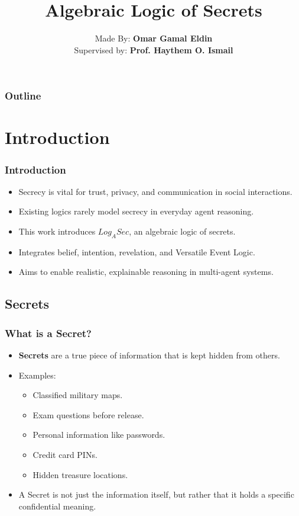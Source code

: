 \documentclass[aspectratio=169]{beamer}
\title{\Huge \textbf{Algebraic Logic of Secrets}}
\author{Made By: \textbf{Omar Gamal Eldin}\\Supervised by: \textbf{Prof. Haythem O. Ismail}}
\institute{}
\date{}
\begin{document}
\frame{\titlepage}


\begin{frame}
\frametitle{Outline}
\tableofcontents[hideallsubsections]
\end{frame}


\section{Introduction}
\begin{frame}
\frametitle{Introduction}
\Large
\begin{itemize}
    \item Secrecy is vital for trust, privacy, and communication in social interactions.
    \item Existing logics rarely model secrecy in everyday agent reasoning.
    \item This work introduces $Log_ASec$, an algebraic logic of secrets.
    \item Integrates belief, intention, revelation, and Versatile Event Logic.
    \item Aims to enable realistic, explainable reasoning in multi-agent systems.
\end{itemize}
\end{frame}

\subsection{Secrets}
\begin{frame}
\frametitle{What is a Secret?}
\Large
\begin{itemize}
    \item \textbf{Secrets} are a true piece of information that is kept hidden from others.
    \item Examples:
    \begin{itemize}
        \item Classified military maps.
        \item Exam questions before release.
        \item Personal information like passwords.
        \item Credit card PINs.
        \item Hidden treasure locations.
    \end{itemize}
    \item A Secret is not just the information itself, but rather that it holds a specific confidential meaning.
\end{itemize}
\end{frame}
\end{document}
